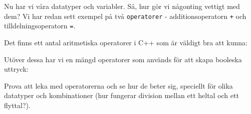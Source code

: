 Nu har vi våra datatyper och variabler. Så, hur gör vi någonting vettigt med dem? Vi har redan sett exempel på två \texttt{operatorer} - additionsoperatorn \texttt{+} och tilldelningsoperatorn \texttt{=}.

Det finns ett antal aritmetiska operatorer i C++ som är väldigt bra att kunna:



Utöver dessa har vi en mängd operatorer som används för att skapa booleska uttryck:



Prova att leka med operatorerna och se hur de beter sig, speciellt för olika datatyper och kombinationer (hur fungerar division mellan ett heltal och ett flyttal?).
